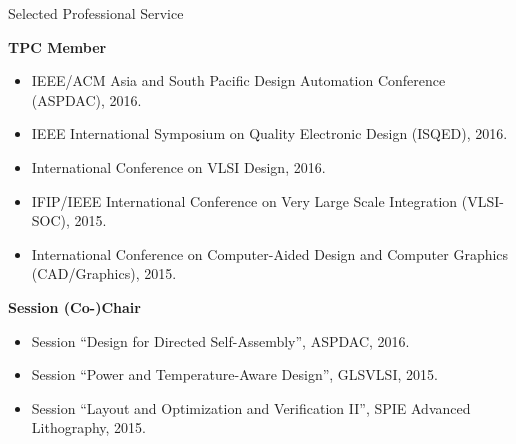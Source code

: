 
\begin{rSection}{Selected Professional Service}

\textbf{TPC Member}
\begin{itemize}
    \item IEEE/ACM Asia and South Pacific Design Automation Conference (ASPDAC), 2016.
    \item IEEE International Symposium on Quality Electronic Design (ISQED), 2016.
    \item International Conference on VLSI Design, 2016.
    \item IFIP/IEEE International Conference on Very Large Scale Integration (VLSI-SOC), 2015.
    \item International Conference on Computer-Aided Design and Computer Graphics (CAD/Graphics), 2015.
\end{itemize}

\textbf{Session (Co-)Chair}
\begin{itemize}
    \item Session ``Design for Directed Self-Assembly'', ASPDAC, 2016.
    \item Session ``Power and Temperature-Aware Design'', GLSVLSI, 2015.
    \item Session ``Layout and Optimization and Verification II'', SPIE Advanced Lithography, 2015.
\end{itemize}

\end{rSection}


